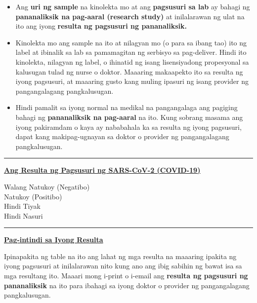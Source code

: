 \documentclass[10pt]{article}
\newcommand{\PageLine}{\rule{\textwidth}{0.25mm}}
\begin{document}
\begin{itemize}
\item

  Ang \textbf{uri ng sample} na kinolekta mo at ang \textbf{pagsusuri sa lab} ay
  bahagi ng \textbf{pananaliksik na pag-aaral (research study)} at inilalarawan
  ng ulat na ito ang iyong \textbf{resulta ng pagsusuri ng pananaliksik.}

\item

  Kinolekta mo ang sample na ito at nilagyan mo (o para sa ibang tao) ito ng
  label at ibinalik sa lab sa pamamagitan ng serbisyo sa pag-deliver. Hindi ito
  kinolekta, nilagyan ng label, o ihinatid ng isang lisensiyadong propesyonal sa
  kalusugan tulad ng nurse o doktor. Maaaring makaapekto ito sa resulta ng iyong
  pagsusuri, at maaaring gusto kang muling ipasuri ng isang provider ng
  pangangalagang pangkalusugan.

\item

  Hindi pamalit sa iyong normal na medikal na pangangalaga ang pagiging bahagi
  ng \textbf{pananaliksik na pag-aaral} na ito. Kung sobrang masama ang iyong
  pakiramdam o kaya ay nababahala ka sa resulta ng iyong pagsusuri, dapat kang
  makipag-ugnayan sa doktor o provider ng pangangalagang pangkalusugan.

\end{itemize}

\bigskip
\PageLine

\large \underline{\textbf{Ang Resulta ng Pagsusuri ng SARS-CoV-2 (COVID-19)}}

Walang Natukoy (Negatibo)\\
Natukoy (Positibo)\\
Hindi Tiyak\\
Hindi Nasuri\\

\PageLine
\bigskip

\large \underline{\textbf{Pag-intindi sa Iyong Resulta}}

Ipinapakita ng table na ito ang lahat ng mga resulta na maaaring ipakita ng
iyong pagsusuri at inilalarawan nito kung ano ang ibig sabihin ng bawat isa sa
mga resultang ito. Maaari mong i-print o i-email ang \textbf{resulta ng
pagsusuri ng pananaliksik} na ito para ibahagi sa iyong doktor o provider ng
pangangalagang pangkalusugan.
\end{document}
